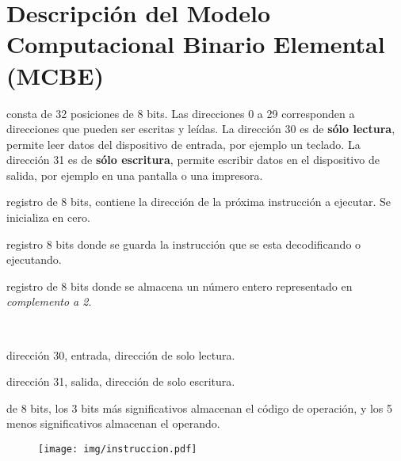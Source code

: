 \documentclass[12pt]{article}
\begin{document}
\appendix
\clearpage
\addappheadtotoc
\appendixpage

\section*{Descripción del Modelo Computacional Binario Elemental (MCBE)}

\begin{description}
    \itemsep2pt \parskip0pt 

    \item[Memoria:] consta de 32 posiciones de 8 bits. Las direcciones 0 a 29
        corresponden a direcciones que pueden ser escritas y leídas. La
        dirección 30 es de \textbf{sólo lectura}, permite leer datos del
        dispositivo de entrada, por ejemplo un teclado. La dirección 31 es de
        \textbf{sólo escritura}, permite escribir datos en el dispositivo de
        salida, por ejemplo en una pantalla o una impresora.

    \item[Registro PC:] registro de 8 bits, contiene la dirección de la
        próxima instrucción a ejecutar. Se inicializa en cero.

    \item[Registro IR:] registro 8 bits donde se guarda la instrucción que se
        esta decodificando o ejecutando.

    \item[Registro acumulador:] registro de 8 bits donde se almacena un
        número entero representado en \emph{complemento a 2}.

    \item[Etiquetas predefinidas:]~

        \begin{description}
            \itemsep2pt \parskip0pt 

            \item[IN:] dirección 30, entrada, dirección de solo lectura.

            \item[OUT:] dirección 31, salida, dirección de solo escritura.

        \end{description}

    \item[Instrucciones:] de 8 bits, los 3 bits más significativos almacenan
        el código de operación, y los 5 menos significativos almacenan el
        operando.

        \begin{figure}[h]
            \centering
            \texttt{[image: img/instruccion.pdf]}
        \end{figure}

\end{description}
\end{document}
